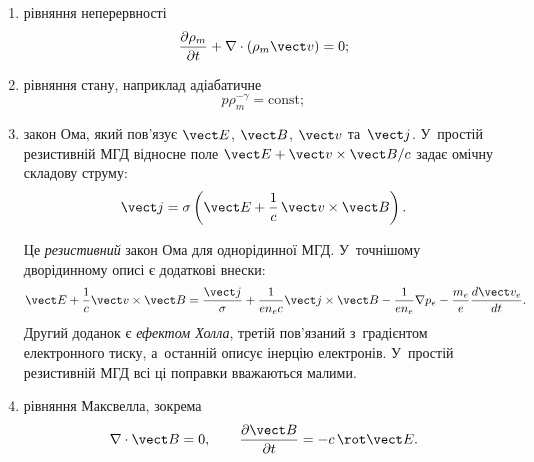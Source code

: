 \begin{enumerate}

    \item рівняння неперервності
    \begin{equation*}
        \frac{\partial\rho_m}{\partial t}
        +
        \nabla\cdot(\rho_m\vect v)
        =0;
    \end{equation*}

    \item рівняння стану, наприклад адіабатичне
    \begin{equation*}
        p\rho_m^{-\gamma}=\mathrm{const};
    \end{equation*}

	\item закон Ома, який пов'язує $\vect E$, $\vect B$, $\vect v$ та~$\vect j$. У~простій
	  резистивній МГД відносне поле $\vect E+\vect v\times\vect B/c$ задає омічну складову
	  струму:
    \begin{equation}\label{eq:Ohm_law_palsma}
        \vect j=\sigma\left(\vect E+\frac{1}{c}\,\vect v\times\vect B\right).
    \end{equation}

Це \emph{резистивний} закон Ома для однорідинної МГД. У~точнішому дворідинному описі є
додаткові внески:
\begin{equation}\label{eq:generalized-ohm}
 \vect E+\frac1c\vect v\times\vect B
 =
 \frac{\vect j}{\sigma}
 +\frac{1}{en_e c}\vect j\times\vect B
 -\frac{1}{en_e}\nabla p_e
 -\frac{m_e}{e}\frac{d\vect v_e}{dt}.
\end{equation}
Другий доданок є \emph{ефектом Холла}, третій пов'язаний з~градієнтом електронного тиску,
а~останній описує інерцію електронів. У~простій резистивній МГД всі ці поправки вважаються
малими.

    \item рівняння Максвелла, зокрема
    \begin{equation*}
        \nabla\cdot\vect B=0,
        \qquad
        \frac{\partial\vect B}{\partial t}
        =
        -c\,\rot\vect E.
    \end{equation*}

\end{enumerate}

